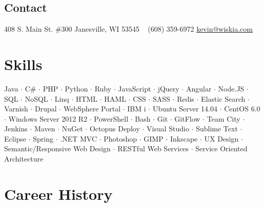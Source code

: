 \documentclass[]{clean-resume}
\begin{document}



\begin{aside}
  \section{Contact}
    408 S. Main St. \#300
	Janesville, WI 53545
    ~
    (608) 359-6972
    \href{mailto:kevin@wiskia.com.com?subject=Resume}{kevin@wiskia.com}
\end{aside}


\section{Skills}

\vspace{.25cm}

\begin{centering}
{ \small
	Java $\cdot$
	C\# $\cdot$
	PHP $\cdot$
	Python $\cdot$
	Ruby $\cdot$
	JavaScript $\cdot$
	jQuery $\cdot$
	Angular $\cdot$
	Node.JS $\cdot$
	SQL $\cdot$
	NoSQL $\cdot$
	Linq $\cdot$
	HTML $\cdot$
	HAML $\cdot$
	CSS $\cdot$
	SASS $\cdot$
	Redis $\cdot$
	Elastic Search $\cdot$
	Varnish $\cdot$
	Drupal $\cdot$
	WebSphere Portal $\cdot$
	IBM i $\cdot$
	Ubuntu Server 14.04 $\cdot$
	CentOS 6.0 $\cdot$
	Windows Server 2012 R2 $\cdot$
	PowerShell $\cdot$
	Bash $\cdot$
	Git $\cdot$
	GitFlow $\cdot$
	Team City $\cdot$
	Jenkins $\cdot$
	Maven $\cdot$
	NuGet $\cdot$
	Octopus Deploy $\cdot$
	Visual Studio $\cdot$
	Sublime Text $\cdot$
	Eclipse $\cdot$
	Spring $\cdot$
	.NET MVC $\cdot$
	Photoshop $\cdot$
	GIMP $\cdot$
	Inkscape $\cdot$
	UX Design $\cdot$
	Semantic/Responsive Web Design $\cdot$
	RESTful Web Services $\cdot$
	Service Oriented Architecture
}
\end{centering}

\vspace{.25cm}

\section{Career History}
\end{document}
